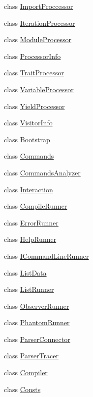 \begin{DoxyCompactItemize}
class \hyperlink{classmocha_1_1_import_proccessor}{ImportProccessor}
\item 
class \hyperlink{classmocha_1_1_iteration_processor}{IterationProcessor}
\item 
class \hyperlink{classmocha_1_1_module_processor}{ModuleProcessor}
\item 
class \hyperlink{classmocha_1_1_processor_info}{ProcessorInfo}
\item 
class \hyperlink{classmocha_1_1_trait_processor}{TraitProcessor}
\item 
class \hyperlink{classmocha_1_1_variable_processor}{VariableProcessor}
\item 
class \hyperlink{classmocha_1_1_yield_processor}{YieldProcessor}
\item 
class \hyperlink{classmocha_1_1_visitor_info}{VisitorInfo}
\item 
class \hyperlink{classmocha_1_1_bootstrap}{Bootstrap}
\item 
class \hyperlink{classmocha_1_1_commands}{Commands}
\item 
class \hyperlink{classmocha_1_1_commands_analyzer}{CommandsAnalyzer}
\item 
class \hyperlink{classmocha_1_1_interaction}{Interaction}
\item 
class \hyperlink{classmocha_1_1_compile_runner}{CompileRunner}
\item 
class \hyperlink{classmocha_1_1_error_runner}{ErrorRunner}
\item 
class \hyperlink{classmocha_1_1_help_runner}{HelpRunner}
\item 
class \hyperlink{classmocha_1_1_i_command_line_runner}{ICommandLineRunner}
\item 
class \hyperlink{classmocha_1_1_list_data}{ListData}
\item 
class \hyperlink{classmocha_1_1_list_runner}{ListRunner}
\item 
class \hyperlink{classmocha_1_1_observer_runner}{ObserverRunner}
\item 
class \hyperlink{classmocha_1_1_phantom_runner}{PhantomRunner}
\item 
class \hyperlink{classmocha_1_1_parser_connector}{ParserConnector}
\item 
class \hyperlink{classmocha_1_1_parser_tracer}{ParserTracer}
\item 
class \hyperlink{classmocha_1_1_compiler}{Compiler}
\item 
class \hyperlink{classmocha_1_1_consts}{Consts}
\item 

\end{DoxyCompactItemize}

